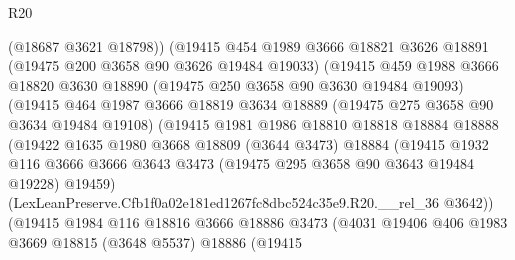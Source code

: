 \begin{lexlean}{R20}
\begin{coremodule}
                        (@18687 @3621 @18798))
                      (@19415
                        @454
                        @1989
                        @3666
                        @18821
                        @3626
                        @18891
                        (@19475 @200 @3658 @90 @3626 @19484 @19033)
                        (@19415
                          @459
                          @1988
                          @3666
                          @18820
                          @3630
                          @18890
                          (@19475 @250 @3658 @90 @3630 @19484 @19093)
                          (@19415
                            @464
                            @1987
                            @3666
                            @18819
                            @3634
                            @18889
                            (@19475 @275 @3658 @90 @3634 @19484 @19108)
                            (@19415
                              @1981
                              @1986
                              @18810
                              @18818
                              @18884
                              @18888
                              (@19422
                                @1635
                                @1980
                                @3668
                                @18809
                                (@3644 @3473)
                                @18884
                                (@19415
                                  @1932
                                  @116
                                  @3666
                                  @3666
                                  @3643
                                  @3473
                                  (@19475 @295 @3658 @90 @3643 @19484 @19228)
                                  @19459)
                                (LexLeanPreserve.Cfb1f0a02e181ed1267fc8dbc524c35e9.R20.__rel_36
                                  @3642))
                              (@19415
                                @1984
                                @116
                                @18816
                                @3666
                                @18886
                                @3473
                                (@4031
                                  @19406
                                  @406
                                  @1983
                                  @3669
                                  @18815
                                  (@3648 @5537)
                                  @18886
                                  (@19415

\end{coremodule}
\end{lexlean}
